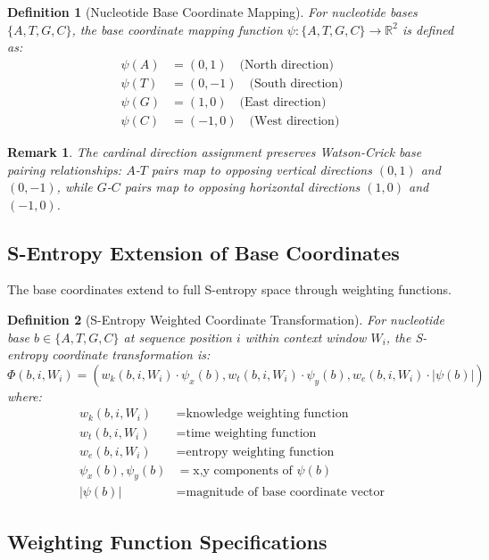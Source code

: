\documentclass[12pt,a4paper]{article}
\newtheorem{definition}{Definition}
\newtheorem{remark}{Remark}
\begin{document}
\begin{definition}[Nucleotide Base Coordinate Mapping]
For nucleotide bases $\{A, T, G, C\}$, the base coordinate mapping function $\psi: \{A,T,G,C\} \rightarrow \mathbb{R}^2$ is defined as:
\begin{align}
\psi(A) &= (0, 1) \quad \text{(North direction)} \\
\psi(T) &= (0, -1) \quad \text{(South direction)} \\
\psi(G) &= (1, 0) \quad \text{(East direction)} \\
\psi(C) &= (-1, 0) \quad \text{(West direction)}
\end{align}
\end{definition}

\begin{remark}
The cardinal direction assignment preserves Watson-Crick base pairing relationships: $A$-$T$ pairs map to opposing vertical directions $(0,1)$ and $(0,-1)$, while $G$-$C$ pairs map to opposing horizontal directions $(1,0)$ and $(-1,0)$.
\end{remark}

\subsection{S-Entropy Extension of Base Coordinates}

The base coordinates extend to full S-entropy space through weighting functions.

\begin{definition}[S-Entropy Weighted Coordinate Transformation]
For nucleotide base $b \in \{A,T,G,C\}$ at sequence position $i$ within context window $W_i$, the S-entropy coordinate transformation is:
$$\Phi(b,i,W_i) = (w_k(b,i,W_i) \cdot \psi_x(b), w_t(b,i,W_i) \cdot \psi_y(b), w_e(b,i,W_i) \cdot |\psi(b)|)$$
where:
\begin{align}
w_k(b,i,W_i) &= \text{knowledge weighting function} \\
w_t(b,i,W_i) &= \text{time weighting function} \\
w_e(b,i,W_i) &= \text{entropy weighting function} \\
\psi_x(b), \psi_y(b) &= \text{x,y components of } \psi(b) \\
|\psi(b)| &= \text{magnitude of base coordinate vector}
\end{align}
\end{definition}

\subsection{Weighting Function Specifications}
\end{document}
